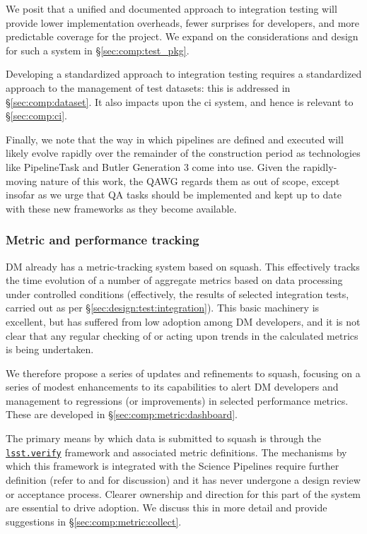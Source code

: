 We posit that a unified and documented approach to integration testing will
provide lower implementation overheads, fewer surprises for developers, and
more predictable coverage for the project. We expand on the considerations and
design for such a system in \S\ref{sec:comp:test_pkg}.

Developing a standardized approach to integration testing requires a
standardized approach to the management of test datasets: this is addressed in
\S\ref{sec:comp:dataset}. It also impacts upon the \gls{ci} system, and hence
is relevant to \S\ref{sec:comp:ci}.

Finally, we note that the way in which pipelines are defined and executed will
likely evolve rapidly over the remainder of the construction period as
technologies like PipelineTask and Butler Generation 3 come into use. Given
the rapidly-moving nature of this work, the QAWG regards them as out of scope,
except insofar as we urge that QA tasks should be implemented and kept up to
date with these new frameworks as they become available.

\subsubsection{Metric and performance tracking}
\label{sec:design:test:metrics}

DM already has a metric-tracking system based on \gls{squash}. This
effectively tracks the time evolution of a number of \glspl{aggregate metric}
based on data processing under controlled conditions (effectively, the results
of selected integration tests, carried out as per
\S\ref{sec:design:test:integration}). This basic machinery is excellent, but
has suffered from low adoption among DM developers, and it is not clear that
any regular checking of or acting upon trends in the calculated metrics is
being undertaken.

We therefore propose a series of updates and refinements to \gls{squash},
focusing on a series of modest enhancements to its capabilities to alert DM
developers and management to regressions (or improvements) in selected
performance metrics. These are developed in \S\ref{sec:comp:metric:dashboard}.

The primary means by which data is submitted to \gls{squash} is through the
\href{https://github.com/lsst/verify}{\texttt{lsst.verify}} framework and
associated metric definitions. The mechanisms by which this framework is
integrated with the Science Pipelines require further definition (refer to
 and  for discussion) and it has never
undergone a design review or acceptance process.  Clearer ownership and
direction for this part of the system are essential to drive adoption. We
discuss this in more detail and provide suggestions in
\S\ref{sec:comp:metric:collect}.
